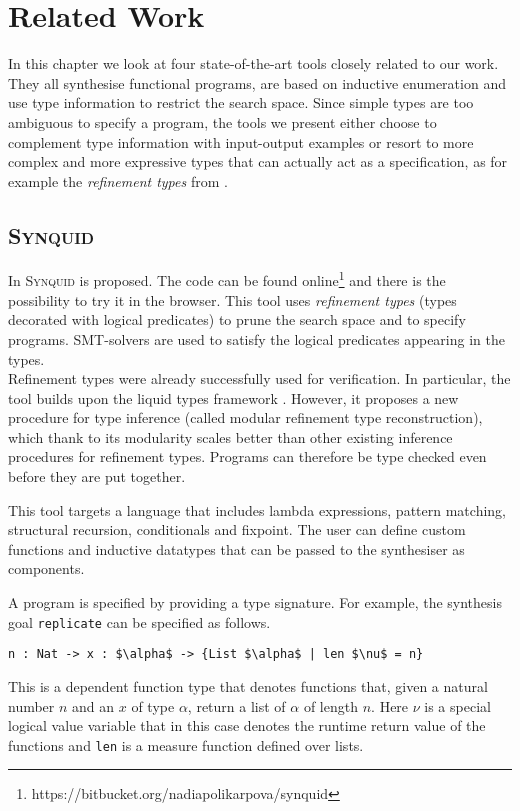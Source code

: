 \lstset{style=plain}

\chapter{Related Work} \label{ch:relatedwork}

In this chapter we look at four state-of-the-art tools closely related to our work. They all synthesise functional programs, are based on inductive enumeration and use type information to restrict the search space. Since simple types are too ambiguous to specify a program, the tools we present either choose to complement type information with input-output examples or resort to more complex and more expressive types that can actually act as a specification, as for example the \emph{refinement types} from \cite{SynquidPaper}.

\section{\mdseries\textsc{Synquid}}

In \cite{SynquidPaper} \textsc{Synquid} is proposed. The code can be found online\footnote{https://bitbucket.org/nadiapolikarpova/synquid} and there is the possibility to try it in the browser.
This tool uses \emph{refinement types} (types decorated with logical predicates) to prune the search space and to specify programs. SMT-solvers are used to satisfy the logical predicates appearing in the types.\\
Refinement types were already successfully used for verification. In particular, the tool builds upon the liquid types framework \cite{LiquidTypes}. However, it proposes a new procedure for type inference (called modular refinement type reconstruction), which thank to its modularity scales better than other existing inference procedures for refinement types. Programs can therefore be type checked even before they are put together.

This tool targets a language that includes lambda expressions, pattern matching, structural recursion, conditionals and fixpoint.
The user can define custom functions and inductive datatypes that can be passed to the synthesiser as components.

A program is specified by providing a type signature. For example, the synthesis goal \lstinline!replicate! can be specified as follows.
\begin{lstlisting}[style=plain]
n : Nat -> x : $\alpha$ -> {List $\alpha$ | len $\nu$ = n}
\end{lstlisting}
This is a dependent function type that denotes functions that, given a natural number $n$ and an $x$ of type $\alpha$, return a list of $\alpha$ of length $n$. Here $\nu$ is a special logical value variable that in this case denotes the runtime return value of the functions and \lstinline!len! is a measure function defined over lists.

